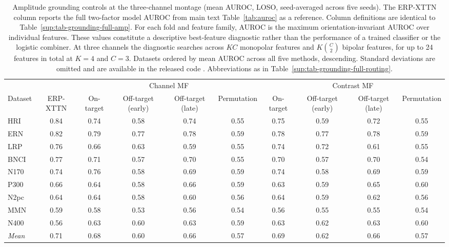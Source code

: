 \begin{table}[t]
\centering
\setlength{\tabcolsep}{5pt}
\caption{%
Amplitude grounding controls at the three-channel montage (mean AUROC, LOSO, seed-averaged across five seeds). The ERP-XTTN column reports the full two-factor model AUROC from main text Table~\ref{tab:auroc} as a reference. Column definitions are identical to Table~\ref{sup:tab-grounding-full-amp}. For each fold and feature family, AUROC is the maximum orientation-invariant AUROC over individual features. These values constitute a descriptive best-feature diagnostic rather than the performance of a trained classifier or the logistic combiner. At three channels the diagnostic searches across $KC$ monopolar features and $K\binom{C}{2}$ bipolar features, for up to 24 features in total at $K=4$ and $C=3$. Datasets ordered by mean AUROC across all five methods, descending. Standard deviations are omitted and are available in the released code \cite{wyman2026erpxttn_code}. Abbreviations as in Table~\ref{sup:tab-grounding-full-routing}.%
}
\label{sup:tab-grounding-3-amp}
\begin{tabular}{l c cccc cccc}
\toprule
 & & \multicolumn{4}{c}{Channel MF} & \multicolumn{4}{c}{Contrast MF} \\
\cmidrule(lr){3-6} \cmidrule(lr){7-10}
Dataset & ERP-XTTN & On-target & Off-target (early) & Off-target (late) & Permutation & On-target & Off-target (early) & Off-target (late) & Permutation \\
\midrule
HRI & 0.84 & 0.74 & 0.58 & 0.74 & 0.55 & 0.75 & 0.59 & 0.72 & 0.55 \\
ERN & 0.82 & 0.79 & 0.77 & 0.78 & 0.59 & 0.78 & 0.77 & 0.78 & 0.59 \\
LRP & 0.76 & 0.66 & 0.63 & 0.59 & 0.55 & 0.74 & 0.72 & 0.61 & 0.55 \\
BNCI & 0.77 & 0.71 & 0.57 & 0.70 & 0.55 & 0.70 & 0.57 & 0.70 & 0.54 \\
N170 & 0.74 & 0.76 & 0.58 & 0.69 & 0.59 & 0.74 & 0.58 & 0.69 & 0.59 \\
P300 & 0.66 & 0.64 & 0.58 & 0.66 & 0.59 & 0.63 & 0.59 & 0.65 & 0.60 \\
N2pc & 0.64 & 0.64 & 0.58 & 0.60 & 0.56 & 0.64 & 0.59 & 0.62 & 0.56 \\
MMN & 0.59 & 0.58 & 0.53 & 0.56 & 0.54 & 0.56 & 0.55 & 0.55 & 0.54 \\
N400 & 0.56 & 0.63 & 0.60 & 0.63 & 0.59 & 0.63 & 0.62 & 0.63 & 0.60 \\
\midrule
\textit{Mean} & 0.71 & 0.68 & 0.60 & 0.66 & 0.57 & 0.69 & 0.62 & 0.66 & 0.57 \\
\bottomrule
\end{tabular}
\end{table}
